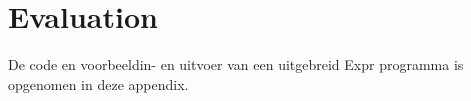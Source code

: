 \chapter[Evaluation]{Evaluation}
De code en voorbeeldin- en uitvoer van een uitgebreid Expr programma is
\cite{atmelISA} opgenomen in deze appendix.
